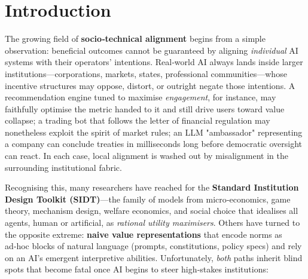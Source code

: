 \section{Introduction}
The growing field of \textbf{socio‑technical alignment} begins from a simple observation: beneficial outcomes cannot be guaranteed by aligning \textit{individual} AI systems with their operators' intentions.  Real‑world AI always lands inside larger institutions—corporations, markets, states, professional communities—whose incentive structures may oppose, distort, or outright negate those intentions.  A recommendation engine tuned to maximise \textit{engagement}, for instance, may faithfully optimise the metric handed to it and still drive users toward value collapse; a trading bot that follows the letter of financial regulation may nonetheless exploit the spirit of market rules; an LLM "ambassador" representing a company can conclude treaties in milliseconds long before democratic oversight can react.  In each case, local alignment is washed out by misalignment in the surrounding institutional fabric.

Recognising this, many researchers have reached for the \textbf{Standard Institution Design Toolkit (SIDT)}—the family of models from micro‑economics, game theory, mechanism design, welfare economics, and social choice that idealises all agents, human or artificial, as \textit{rational utility maximisers}.  Others have turned to the opposite extreme: \textbf{naive value representations} that encode norms as ad‑hoc blocks of natural language (prompts, constitutions, policy specs) and rely on an AI's emergent interpretive abilities.  Unfortunately, \textit{both} paths inherit blind spots that become fatal once AI begins to steer high‑stakes institutions:

